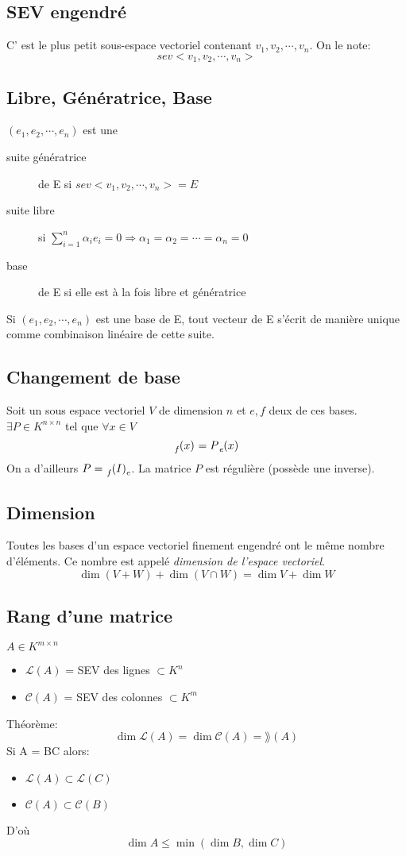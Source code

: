 \subsection{SEV engendré}
C' est le plus petit sous-espace vectoriel contenant $v_1, v_2, \cdots ,v_n$.
On le note: \[ sev< v_1, v_2, \cdots , v_n > \]
\subsection{Libre, Génératrice, Base}
$(e_1, e_2, \cdots , e_n)$ est une
\begin{description}
  \item[suite génératrice] de E si $sev<v_1, v_2, \cdots , v_n> = E$
  \item[suite libre] si $\sum_{i = 1}^{n}\alpha_ie_i = 0\Rightarrow \alpha_1 = \alpha_2 = \cdots = \alpha_n = 0$
  \item[base] de E si elle est à la fois libre et génératrice
\end{description}
Si $(e_1, e_2, \cdots , e_n)$ est une base de E, tout vecteur de E s'écrit de manière unique comme combinaison linéaire de cette suite.
\subsection{Changement de base}
Soit un sous espace vectoriel $V$ de dimension $n$ et $e, f$ deux de ces bases. $\exists P \in K^{n \times n}$ tel que $\forall x \in V$
\[ \tensor*[_f]{(x)}{} = P\tensor*[_e]{(x)}{} \]
On a d'ailleurs $P = \tensor*[_f]{(I)}{_e}$. La matrice $P$ est régulière (possède une inverse).
\subsection{Dimension}
Toutes les bases d'un espace vectoriel finement engendré ont le même nombre d'éléments. Ce nombre est appelé \emph{dimension de l'espace vectoriel}.
\[ \dim(V + W)  + \dim(V \cap W) = \dim V + \dim W \]

\subsection{Rang d'une matrice}
$A \in K^{m\times{n}}$\\
\begin{itemize}
  \item $\mathcal{L}(A)$ = SEV des lignes $\subset K^n$\\
  \item $\mathcal{C}(A)$ = SEV des colonnes $\subset K^m$\\
\end{itemize}
Théorème:
\[ \dim\mathcal{L}(A) = \dim\mathcal{C}(A) = \rang(A) \]
Si A = BC alors:
\begin{itemize}
  \item $\mathcal{L}(A) \subset \mathcal{L}(C)$
  \item $\mathcal{C}(A) \subset \mathcal{C}(B)$
\end{itemize}
D'où
$$\dim A \leq \min(\dim B, \dim C)$$
